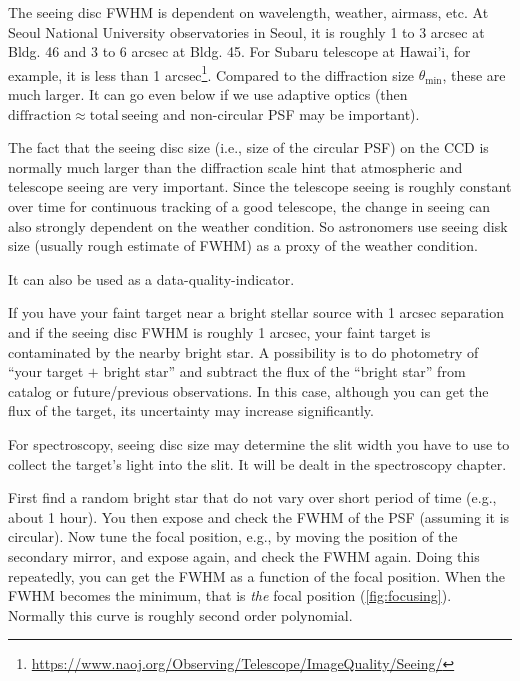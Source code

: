 The seeing disc FWHM is dependent on wavelength, weather, airmass, etc. At Seoul National University observatories in Seoul, it is roughly 1 to 3 arcsec at Bldg. 46 and 3 to 6 arcsec at Bldg. 45. For Subaru telescope at Hawai'i, for example, it is less than 1 arcsec\footnote{\url{https://www.naoj.org/Observing/Telescope/ImageQuality/Seeing/}}. Compared to the diffraction size $ \theta_\mathrm{min} $, these are much larger. It can go even below if we use adaptive optics (then $ \mathrm{diffraction} \approx \mathrm{total~seeing} $ and non-circular PSF may be important).

The fact that the seeing disc size (i.e., size of the circular PSF) on the CCD is normally much larger than the diffraction scale hint that atmospheric and telescope seeing are very important. Since the telescope seeing is roughly constant over time for continuous tracking of a good telescope, the change in seeing can also strongly dependent on the weather condition. So astronomers use seeing disk size (usually rough estimate of FWHM) as a proxy of the weather condition.

It can also be used as a data-quality-indicator.

\begin{ex}
If you have your faint target near a bright stellar source with 1 arcsec separation and if the seeing disc FWHM is roughly 1 arcsec, your faint target is contaminated by the nearby bright star. A possibility is to do photometry of ``your target $ + $ bright star'' and subtract the flux of the ``bright star'' from catalog or future/previous observations. In this case, although you can get the flux of the target, its uncertainty may increase significantly. 
\end{ex}

\begin{ex}
For spectroscopy, seeing disc size may determine the slit width you have to use to collect the target's light into the slit. It will be dealt in the spectroscopy chapter.
\end{ex}

\begin{ex}
First find a random bright star that do not vary over short period of time (e.g., about 1 hour). You then expose and check the FWHM of the PSF (assuming it is circular). Now tune the focal position, e.g., by moving the position of the secondary mirror, and expose again, and check the FWHM again. Doing this repeatedly, you can get the FWHM as a function of the focal position. When the FWHM becomes the minimum, that is \textit{the} focal position (\cref{fig:focusing}). Normally this curve is roughly second order polynomial.
\end{ex}

